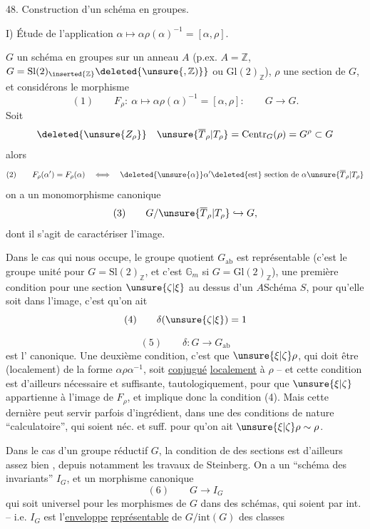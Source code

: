 
48. Construction d'un schéma en groupes.

I) Étude de l'application $\alpha\longmapsto
\alpha\rho(\alpha)^{-1}=[\alpha,\rho]$.

 $G$ un schéma en groupes sur un anneau
$A$ (p.ex. $A=\mathbb Z$, $G=\mathrm{Sl}(2)_{\inserted{\mathbb Z}}
\deleted{\unsure{,\mathbb Z)}}$ ou $\mathrm{Gl}(2)_{\mathbb Z}$),
$\rho$ une section de $G$, et considérons le morphisme
\[
(1)\qquad
F_\rho:\ \alpha\longmapsto\alpha\rho(\alpha)^{-1}
=[\alpha,\rho]:\qquad G\longrightarrow G.
\]
Soit
\[
\deleted{\unsure{Z_\rho}}\quad
\unsure{\overline T_\rho|T_\rho}
=\mathrm{Centr}_G(\rho)=G^\rho\subset G
\]
alors
\[
(2)\qquad
F_\rho(\alpha')=F_\rho(\alpha)\quad\Longleftrightarrow\quad
\deleted{\unsure{\alpha}}\alpha'\deleted{\text{est}}
\text{ section de }\alpha\unsure{\overline T_\rho|T_\rho}
\]
 on a un monomorphisme canonique
\[
(3)\qquad
G/\unsure{\overline T_\rho|T_\rho}\hookrightarrow G,
\]
dont il s'agit de caractériser l'image.

Dans le cas qui nous occupe, le groupe quotient $G_{\mathrm{ab}}$
est représentable (c'est le groupe unité pour
$G=\mathrm{Sl}(2)_{\mathbb Z}$, et c'est $\mathbb G_m$ si
$G=\mathrm{Gl}(2)_{\mathbb Z}$),
 une première condition pour
une section $\unsure{\zeta|\xi}$
au dessus d'un $A$Schéma $S$,  pour qu'elle
soit dans l'image, c'est qu'on ait
\[
(4)\qquad\delta(\unsure{\zeta|\xi})=1
\]

\[
(5)\qquad \delta:G\longrightarrow G_{\mathrm{ab}}
\]
est l' canonique. Une deuxième condition, c'est que $\unsure{\xi|\zeta}\rho$, qui doit être (localement) de la forme $\alpha\rho\alpha^{-1}$, soit \uline{conjugué} \uline{localement} à $\rho$ -- et cette condition est d'ailleurs nécessaire et suffisante, tautologiquement, pour que $\unsure{\xi|\zeta}$ appartienne à l'image de $F_\rho$, et implique donc la condition (4). Mais cette dernière peut servir parfois d'ingrédient,  dans une  des conditions de nature ``calculatoire'', qui soient néc. et suff. pour qu'on ait $\unsure{\xi|\zeta}\rho\sim\rho$.

Dans le cas d'un groupe réductif $G$, la condition de   des sections est d'ailleurs assez bien , depuis notamment les travaux de Steinberg. On a un ``schéma des invariants'' $I_G$, et un morphisme canonique
\[
(6)\qquad G\longrightarrow I_G
\]
\unsure{(}qui soit universel  pour les morphismes de $G$ dans des schémas, qui soient  par  int. -- i.e. $I_G$ est l'\uline{enveloppe} \uline{représentable} de $G/\mathrm{int}(G)$  des classes


